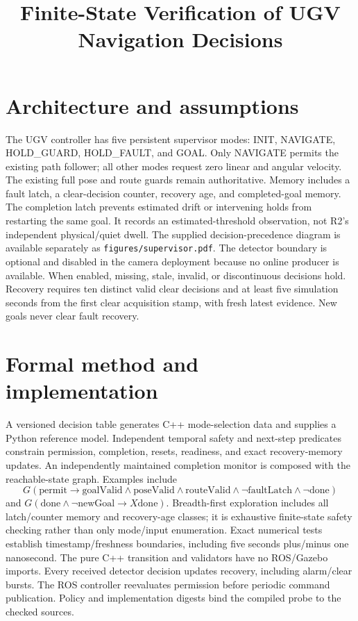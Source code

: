 \documentclass[10pt]{article}
\title{Finite-State Verification of UGV Navigation Decisions}
\author{}\date{}
\begin{document}
\maketitle
\section{Architecture and assumptions}
The UGV controller has five persistent supervisor modes: INIT, NAVIGATE, HOLD\_GUARD,
HOLD\_FAULT, and GOAL. Only NAVIGATE permits the existing path follower; all other modes
request zero linear and angular velocity. The existing full pose and route guards remain authoritative.
Memory includes a fault latch, a clear-decision counter, recovery age, and completed-goal memory.
The completion latch prevents estimated drift or intervening holds from restarting the same goal.
It records an estimated-threshold observation, not R2's independent physical/quiet dwell.
The supplied decision-precedence diagram is available separately as \texttt{figures/supervisor.pdf}.
The detector boundary is optional and disabled in the camera deployment because no online producer
is available. When enabled, missing, stale, invalid, or discontinuous decisions hold. Recovery requires
ten distinct valid clear decisions and at least five simulation seconds from the first clear acquisition
stamp, with fresh latest evidence. New goals never clear fault recovery.
\section{Formal method and implementation}
A versioned decision table generates C++ mode-selection data and supplies a Python reference model.
Independent temporal safety and next-step predicates constrain permission, completion, resets,
readiness, and exact recovery-memory updates. An independently maintained completion monitor is
composed with the reachable-state graph. Examples include
\[
G(\mathrm{permit}\rightarrow\mathrm{goalValid}\land\mathrm{poseValid}\land
\mathrm{routeValid}\land\neg\mathrm{faultLatch}\land\neg\mathrm{done})
\]
and \(G(\mathrm{done}\land\neg\mathrm{newGoal}\rightarrow X\mathrm{done})\).
Breadth-first exploration includes all latch/counter memory and recovery-age classes;
it is exhaustive finite-state safety checking rather than only mode/input enumeration.
Exact numerical tests establish timestamp/freshness boundaries, including five seconds plus/minus one nanosecond.
The pure C++ transition and validators have no ROS/Gazebo imports. Every received detector decision
updates recovery, including alarm/clear bursts. The ROS controller reevaluates permission before
periodic command publication. Policy and implementation digests bind the compiled probe to the checked sources.
\end{document}
